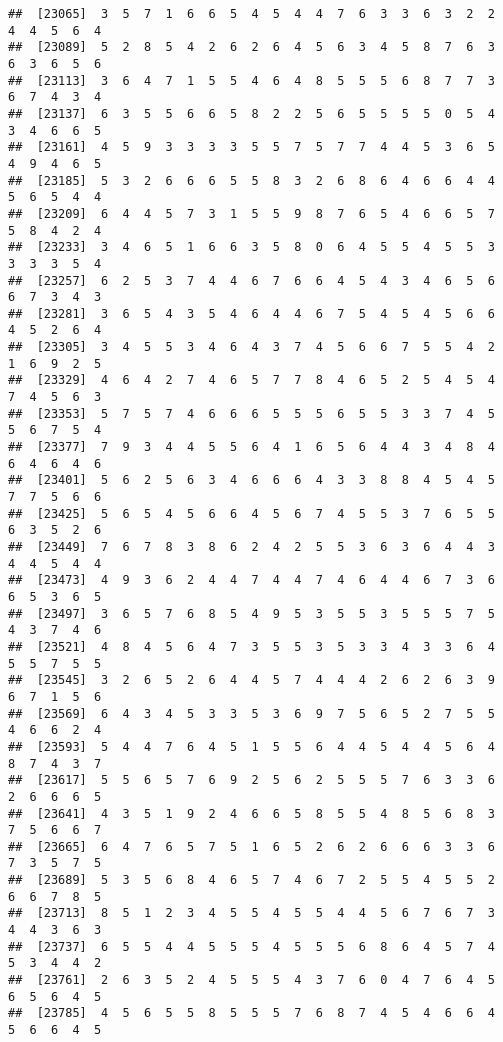 \documentclass[
]{book}
\begin{document}
\begin{verbatim}
##  [23065]  3  5  7  1  6  6  5  4  5  4  4  7  6  3  3  6  3  2  2  4  4  5  6  4
##  [23089]  5  2  8  5  4  2  6  2  6  4  5  6  3  4  5  8  7  6  3  6  3  6  5  6
##  [23113]  3  6  4  7  1  5  5  4  6  4  8  5  5  5  6  8  7  7  3  6  7  4  3  4
##  [23137]  6  3  5  5  6  6  5  8  2  2  5  6  5  5  5  5  0  5  4  3  4  6  6  5
##  [23161]  4  5  9  3  3  3  3  5  5  7  5  7  7  4  4  5  3  6  5  4  9  4  6  5
##  [23185]  5  3  2  6  6  6  5  5  8  3  2  6  8  6  4  6  6  4  4  5  6  5  4  4
##  [23209]  6  4  4  5  7  3  1  5  5  9  8  7  6  5  4  6  6  5  7  5  8  4  2  4
##  [23233]  3  4  6  5  1  6  6  3  5  8  0  6  4  5  5  4  5  5  3  3  3  3  5  4
##  [23257]  6  2  5  3  7  4  4  6  7  6  6  4  5  4  3  4  6  5  6  6  7  3  4  3
##  [23281]  3  6  5  4  3  5  4  6  4  4  6  7  5  4  5  4  5  6  6  4  5  2  6  4
##  [23305]  3  4  5  5  3  4  6  4  3  7  4  5  6  6  7  5  5  4  2  1  6  9  2  5
##  [23329]  4  6  4  2  7  4  6  5  7  7  8  4  6  5  2  5  4  5  4  7  4  5  6  3
##  [23353]  5  7  5  7  4  6  6  6  5  5  5  6  5  5  3  3  7  4  5  5  6  7  5  4
##  [23377]  7  9  3  4  4  5  5  6  4  1  6  5  6  4  4  3  4  8  4  6  4  6  4  6
##  [23401]  5  6  2  5  6  3  4  6  6  6  4  3  3  8  8  4  5  4  5  7  7  5  6  6
##  [23425]  5  6  5  4  5  6  6  4  5  6  7  4  5  5  3  7  6  5  5  6  3  5  2  6
##  [23449]  7  6  7  8  3  8  6  2  4  2  5  5  3  6  3  6  4  4  3  4  4  5  4  4
##  [23473]  4  9  3  6  2  4  4  7  4  4  7  4  6  4  4  6  7  3  6  6  5  3  6  5
##  [23497]  3  6  5  7  6  8  5  4  9  5  3  5  5  3  5  5  5  7  5  4  3  7  4  6
##  [23521]  4  8  4  5  6  4  7  3  5  5  3  5  3  3  4  3  3  6  4  5  5  7  5  5
##  [23545]  3  2  6  5  2  6  4  4  5  7  4  4  4  2  6  2  6  3  9  6  7  1  5  6
##  [23569]  6  4  3  4  5  3  3  5  3  6  9  7  5  6  5  2  7  5  5  4  6  6  2  4
##  [23593]  5  4  4  7  6  4  5  1  5  5  6  4  4  5  4  4  5  6  4  8  7  4  3  7
##  [23617]  5  5  6  5  7  6  9  2  5  6  2  5  5  5  7  6  3  3  6  2  6  6  6  5
##  [23641]  4  3  5  1  9  2  4  6  6  5  8  5  5  4  8  5  6  8  3  7  5  6  6  7
##  [23665]  6  4  7  6  5  7  5  1  6  5  2  6  2  6  6  6  3  3  6  7  3  5  7  5
##  [23689]  5  3  5  6  8  4  6  5  7  4  6  7  2  5  5  4  5  5  2  6  6  7  8  5
##  [23713]  8  5  1  2  3  4  5  5  4  5  5  4  4  5  6  7  6  7  3  4  4  3  6  3
##  [23737]  6  5  5  4  4  5  5  5  4  5  5  5  6  8  6  4  5  7  4  5  3  4  4  2
##  [23761]  2  6  3  5  2  4  5  5  5  4  3  7  6  0  4  7  6  4  5  6  5  6  4  5
##  [23785]  4  5  6  5  5  8  5  5  5  7  6  8  7  4  5  4  6  6  4  5  6  6  4  5

\end{verbatim}
\end{document}
